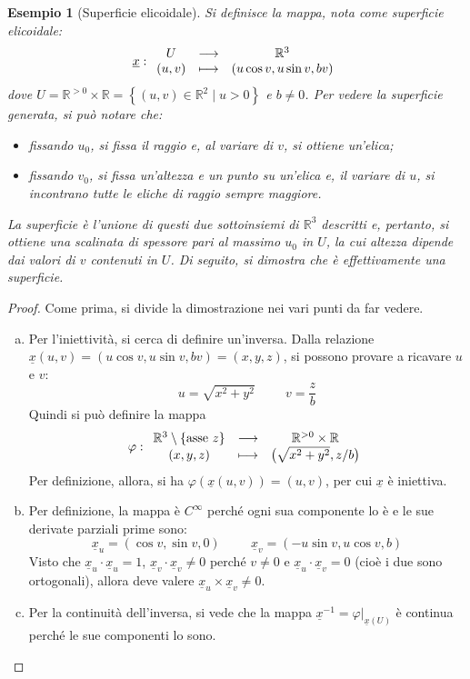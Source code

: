 \documentclass[12pt]{article}
\theoremstyle{style}
\newtheorem{esempio}{Esempio}[section]
\numberwithin{equation}{subsection}
\begin{document}
\begin{esempio}
	[Superficie elicoidale]
	Si definisce la mappa, nota come \textit{superficie elicoidale}:
	\[
	\underline{x}:
	\begin{array}
		{c c c}
		U&\longrightarrow & \mathbb{R}^3\\
		(u,v) & \longmapsto & (u \cos v, u \sin v , b v)
	\end{array}
	\] 
	dove $U = \mathbb{R}^{>0} \times \mathbb{R} = \left\{ (u,v)\in \mathbb{R}^2  \mid  u >0 \right\} $ e $b \neq 0$.
	Per vedere la superficie generata, si pu\`o notare che:
	\begin{itemize}
		\item fissando $u_0$, si fissa il raggio e, al variare di $v$, si ottiene un'elica;
		\item fissando $v_0$, si fissa un'altezza e un punto su un'elica e, il variare di $u$, si incontrano tutte le eliche di raggio sempre maggiore.
	\end{itemize}
	La superficie \`e l'unione di questi due sottoinsiemi di $\mathbb{R}^3$ descritti e, pertanto, si ottiene una scalinata di spessore pari al massimo $u_0$ in $U$, la cui altezza dipende dai valori di $v$ contenuti in $U$.
	Di seguito, si dimostra che \`e effettivamente una superficie.
\end{esempio}
\begin{proof}
	Come prima, si divide la dimostrazione nei vari punti da far vedere.
	\begin{enumerate}[(a).]
		\item Per l'iniettivit\`a, si cerca di definire un'inversa.
			Dalla relazione $\underline{x}(u,v) = (u \cos v , u \sin v , b v ) = (x,y,z)$, si possono provare a ricavare $u$ e $v$:
			\[
			u = \sqrt{x^2 + y^2} \hspace{1cm}v = \frac{z}{b}
			\] 
			Quindi si pu\`o definire la mappa 
			\[
			\varphi : 
			\begin{array}
				{c c c}
				\mathbb{R}^3 \setminus \left\{ \text{asse } z \right\} & \longrightarrow & \mathbb{R}^{>0} \times \mathbb{R}\\
				(x,y,z) & \longmapsto & \big(\sqrt{x^2 + y^2} , z / b\big)
			\end{array}
			\] 
			Per definizione, allora, si ha $\varphi (\underline{x}(u,v)) = (u,v)$, per cui $\underline{x}$ \`e iniettiva.
		\item Per definizione, la mappa \`e $C^\infty$ perch\'e ogni sua componente lo \`e e le sue derivate parziali prime sono:
			\[
			\underline{x}_u = (\cos v, \sin v , 0) \hspace{1cm}\underline{x}_v = (- u \sin v , u \cos v , b)
			\] 
			Visto che $\underline{x}_u \cdot \underline{x}_u = 1$, $\underline{x}_v \cdot  \underline{x}_v \neq 0$ perch\'e $v\neq 0$ e $\underline{x}_u \cdot \underline{x}_v = 0$ (cio\`e i due sono ortogonali), allora deve valere $\underline{x}_u \times \underline{x}_v \neq 0$.
		\item Per la continuit\`a dell'inversa, si vede che la mappa $\underline{x}^{-1} = \varphi |_{\underline{x}(U)} $ \`e continua perch\'e le sue componenti lo sono.
	\end{enumerate}
\end{proof}
\end{document}
